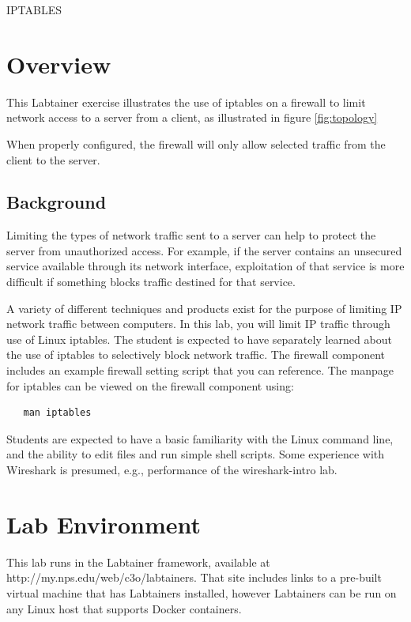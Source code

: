 


\begin{center}
{\LARGE IPTABLES}
\vspace{0.1in}\\
\end{center}


\section{Overview}
This Labtainer exercise illustrates the use of iptables
on a firewall to limit network access to a server from a client,
as illustrated in figure 
\ref{fig:topology}

When properly configured, the firewall will only allow selected
traffic from the client to the server.

\subsection {Background}
Limiting the types of network traffic sent to a server can help to
protect the server from unauthorized access.  For example, if the
server contains an unsecured service available through its network
interface, exploitation of that service is more difficult if something
blocks traffic destined for that service.

A variety of different techniques and products exist for the purpose of limiting
IP network traffic between computers.  In this lab, you will limit IP traffic through
use of Linux iptables.  
The student is expected to have separately learned about the use of iptables
to selectively block network traffic. The firewall component includes an
example firewall setting script that you can reference.  The manpage for iptables can be viewed on the
firewall component using:
\begin{verbatim}
   man iptables
\end{verbatim}

Students are expected to have a basic 
familiarity with the Linux command line, and the ability to edit files and
run simple shell scripts. Some experience with Wireshark is presumed, e.g., performance of
the wireshark-intro lab.

\section{Lab Environment}
This lab runs in the Labtainer framework,
available at http://my.nps.edu/web/c3o/labtainers.
That site includes links to a pre-built virtual machine
that has Labtainers installed, however Labtainers can
be run on any Linux host that supports Docker containers.

